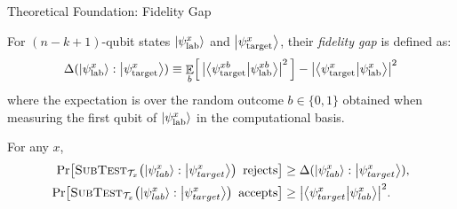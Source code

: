 \begin{frame}{Theoretical Foundation: Fidelity Gap}
    \begin{definition}
        For $(n-k+1)$-qubit states $\ket{\psi_{\text{lab}}^x}$ and $\ket{\psi_{\text{target}}^x}$, 
        their \emph{fidelity gap} is defined as:
        \[
            \Delta(\ket{\psi_{\text{lab}}^x} : \ket{\psi_{\text{target}}^x}) \equiv \mathop{\mathbb{E}}_{b}\!\left[\,\abs{\braket{\psi_{\text{target}}^{xb}}{\psi_{\text{lab}}^{xb}}}^2\,\right] - \abs{\braket{\psi_{\text{target}}^x}{\psi_{\text{lab}}^x}}^2
        \]
        where the expectation is over the random outcome $b \in \{0,1\}$ obtained when measuring the first qubit of $\ket{\psi_{\text{lab}}^x}$ in the computational basis.
    \end{definition}

    \vspace{0.5em}

    \begin{theorem}\label{thm:subtest}
        For any $x$, 
        \begin{align}
            \Pr\!\left[\textsc{SubTest}_{\mathcal{T}_x}\!\left(\ket{\psi_{lab}^x}:\ket{\psi_{target}^x}\right) \text{ rejects}\right]
                &\geq \Delta(\ket{\psi_{lab}^x}:\ket{\psi_{target}^x}), \label{eqn:reject}\\
            \Pr\!\left[\textsc{SubTest}_{\mathcal{T}_x}\!\left(\ket{\psi_{lab}^x}:\ket{\psi_{target}^x}\right) \text{ accepts}\right]
                &\geq \abs{\braket{\psi_{target}^x}{\psi_{lab}^x}}^2. \label{eqn:accept}
        \end{align}
    \end{theorem}
\end{frame}

